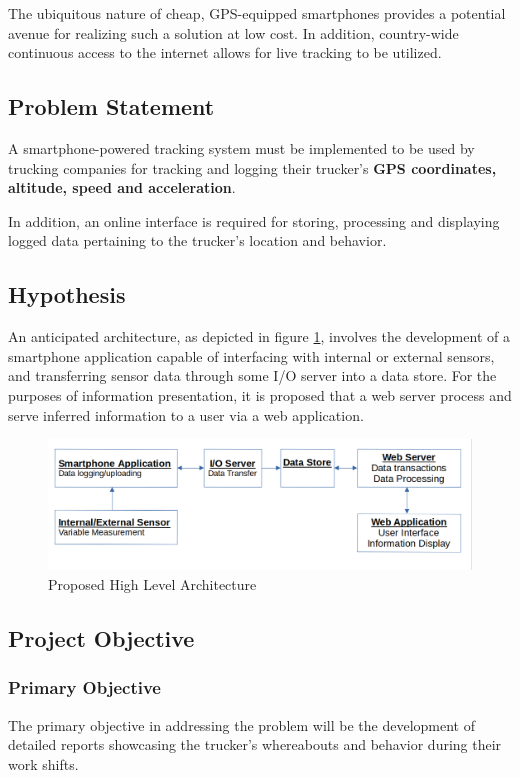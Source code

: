 The ubiquitous nature of cheap, GPS-equipped smartphones provides a potential avenue for realizing such a solution at low cost.
In addition, country-wide continuous access to the internet allows for live tracking to be utilized. 

\subsection{Problem Statement}
A smartphone-powered tracking system must be implemented to be used by trucking companies for tracking and logging their trucker's \textbf{GPS coordinates, altitude, speed and acceleration}.

In addition, an online interface is required for storing, processing and displaying logged data pertaining to the trucker's location and behavior.

\subsection{Hypothesis}
An anticipated architecture, as depicted in figure \ref{fig:high_arch}, involves the development of a smartphone application capable of interfacing with internal or external sensors, and transferring sensor data through some I/O server into a data store. \cite{bertocco1998client}
For the purposes of information presentation, it is proposed that a web server process and serve inferred information to a user via a web application.
\begin{figure}[H]
    \centering
    \includegraphics[scale=0.45]{high_arch.png}
    \caption{Proposed High Level Architecture}
    \label{fig:high_arch}
\end{figure}

\subsection{Project Objective}
\subsubsection{Primary Objective}
The primary objective in addressing the problem will be the development of detailed reports showcasing the trucker's whereabouts and behavior during their work shifts.

